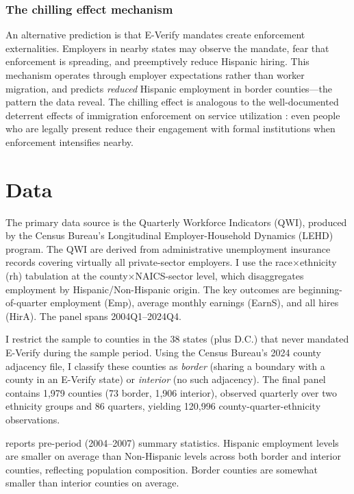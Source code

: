 \documentclass[12pt]{article}
\begin{document}
\subsubsection*{The chilling effect mechanism} An alternative prediction is that E-Verify mandates create enforcement externalities. Employers in nearby states may observe the mandate, fear that enforcement is spreading, and preemptively reduce Hispanic hiring. This mechanism operates through employer expectations rather than worker migration, and predicts \textit{reduced} Hispanic employment in border counties---the pattern the data reveal. The chilling effect is analogous to the well-documented deterrent effects of immigration enforcement on service utilization \citep{watson2014, alsan2019}: even people who are legally present reduce their engagement with formal institutions when enforcement intensifies nearby.

\section{Data}

The primary data source is the Quarterly Workforce Indicators (QWI), produced by the Census Bureau's Longitudinal Employer-Household Dynamics (LEHD) program. The QWI are derived from administrative unemployment insurance records covering virtually all private-sector employers. I use the race$\times$ethnicity (rh) tabulation at the county$\times$NAICS-sector level, which disaggregates employment by Hispanic/Non-Hispanic origin. The key outcomes are beginning-of-quarter employment (Emp), average monthly earnings (EarnS), and all hires (HirA). The panel spans 2004Q1--2024Q4.

I restrict the sample to counties in the 38 states (plus D.C.) that never mandated E-Verify during the sample period. Using the Census Bureau's 2024 county adjacency file, I classify these counties as \textit{border} (sharing a boundary with a county in an E-Verify state) or \textit{interior} (no such adjacency). The final panel contains 1,979 counties (73 border, 1,906 interior), observed quarterly over two ethnicity groups and 86 quarters, yielding 120,996 county-quarter-ethnicity observations.



 reports pre-period (2004--2007) summary statistics. Hispanic employment levels are smaller on average than Non-Hispanic levels across both border and interior counties, reflecting population composition. Border counties are somewhat smaller than interior counties on average.
\end{document}
